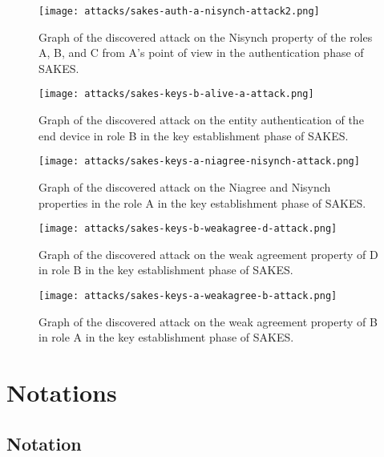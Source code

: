 \begin{sidewaysfigure}
	\centering
	\texttt{[image: attacks/sakes-auth-a-nisynch-attack2.png]}
	\caption{Graph of the discovered attack on the Nisynch property of the roles A, B, and C from A's point of view in the authentication phase of SAKES.}
	\label{fig:sakes-attack-nisynch}
\end{sidewaysfigure}

\begin{sidewaysfigure}
	\centering
	\texttt{[image: attacks/sakes-keys-b-alive-a-attack.png]}
	\caption{Graph of the discovered attack on the entity authentication of the end device in role B in the key establishment phase of SAKES.}
	\label{fig:sakes-attack-keys-b-alive-a}
\end{sidewaysfigure}

\begin{sidewaysfigure}
	\centering
	\texttt{[image: attacks/sakes-keys-a-niagree-nisynch-attack.png]}
	\caption{Graph of the discovered attack on the Niagree and Nisynch properties in the role A in the key establishment phase of SAKES.}
	\label{fig:sakes-attack-keys-a-niagree-nisynch}
\end{sidewaysfigure}

\begin{sidewaysfigure}
	\centering
	\texttt{[image: attacks/sakes-keys-b-weakagree-d-attack.png]}
	\caption{Graph of the discovered attack on the weak agreement property of D in role B in the key establishment phase of SAKES.}
	\label{fig:sakes-attack-keys-b-weakagree-d}
\end{sidewaysfigure}

\begin{sidewaysfigure}
	\centering
	\texttt{[image: attacks/sakes-keys-a-weakagree-b-attack.png]}
	\caption{Graph of the discovered attack on the weak agreement property of B in role A in the key establishment phase of SAKES.}
	\label{fig:sakes-attack-keys-a-weakagree-b}
\end{sidewaysfigure}


\chapter{Notations}

\section{Notation}
\label{app:notations}

